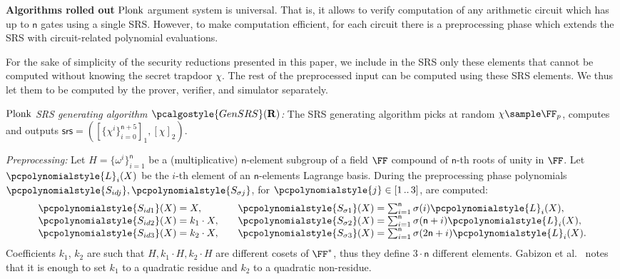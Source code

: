\documentclass[10pt]{llncs}
\renewcommand{\kgen}{\pcalgostyle{GenSRS}}
\newcommand{\pcvarstyle}[1]{\mathsf{#1}}
\newcommand{\myskip}{-0.16\baselineskip}
\newcommand{\range}[2] {[#1 \, .. \, #2]}
\newcommand{\smallset}[1] {\{#1\}}
\newcommand{\p}[1]{\pcpolynomialstyle{#1}}
\newcommand{\numberofconstrains}{\pcvarstyle{n}}
\newcommand{\noofc}{\numberofconstrains}
\newcommand{\bmap}[2] {\left[#1\right]_{#2}}
\newcommand{\gone}[1] {\bmap{#1}{1}}
\newcommand{\gtwo}[1] {\bmap{#1}{2}}
\newcommand{\srs}{\pcvarstyle{srs}}
\newcommand{\lag}{\p{L}}
\newcommand{\REL}{\mathbf{R}}
\newcommand{\plonk}{\ensuremath{\textnormal{{Plonk}}}}
\newcommand{\oursubsub}[1] {\smallskip\noindent\textbf{#1}}
\newcommand{\ourpar}[1] {\smallskip\noindent\emph{#1}}
\begin{document}
\oursubsub{Algorithms rolled out}
\label{sec:plonk_explained}
\plonk{} argument system is universal. That is, it allows to verify computation
of any arithmetic circuit which has up to $\numberofconstrains$
gates using a single SRS. However, to make computation efficient, for each
circuit there is a preprocessing phase which extends the SRS with
circuit-related polynomial evaluations.

For the sake of simplicity of the security reductions presented in this paper, we
include in the SRS only these elements that cannot be computed without knowing
the secret trapdoor $\chi$. The rest of the preprocessed input can
be computed using these SRS elements. We thus let them to be computed by the
prover, verifier, and simulator separately.

\ourpar{$\plonk$ SRS generating algorithm $\kgen(\REL)$:}
The SRS generating algorithm picks at random $\chi \sample \FF_p$, computes
and outputs
\(
\srs = \left(\gone{\smallset{\chi^i}_{i = 0}^{\numberofconstrains + 5}},
\gtwo{\chi} \right).
\)

\ourpar{Preprocessing:}
Let $H = \smallset{\omega^i}_{i = 1}^{\numberofconstrains }$ be a
(multiplicative) $\numberofconstrains$-element subgroup of a field $\FF$
compound of $\numberofconstrains$-th roots of unity in $\FF$. Let $\lag_i(X)$ be
the $i$-th element of an $\numberofconstrains$-elements Lagrange basis. During
the preprocessing phase polynomials $\p{S_{id j}}, \p{S_{\sigma j}}$, for
$\p{j} \in \range{1}{3}$, are computed:
\begin{equation*}
\begin{aligned}
\p{S_{id 1}}(X) & = X,\\[\myskip]
\p{S_{id 2}}(X) & = k_1 \cdot X,\\[\myskip]
\p{S_{id 3}}(X) & = k_2 \cdot X,
\end{aligned}
\qquad
\begin{aligned}
\p{S_{\sigma 1}}(X) & = {\textstyle{\sum_{i = 1}^{\noofc} \sigma(i) \lag_i(X)}},\\[\myskip]
\p{S_{\sigma 2}}(X) & = {\textstyle \sum_{i = 1}^{\noofc}
	\sigma(\noofc + i) \lag_i(X)},\\[\myskip]
\p{S_{\sigma 3}}(X) & ={\textstyle\sum_{i = 1}^{\noofc} \sigma(2 \noofc + i) \lag_i(X)}.
\end{aligned}
\end{equation*}
Coefficients $k_1$, $k_2$ are such that $H, k_1 \cdot H, k_2 \cdot H$ are
different cosets of $\FF^*$, thus they define $3 \cdot \noofc$
different elements. Gabizon et al.~\cite{EPRINT:GabWilCio19} notes that it is enough to set
$k_1$ to a quadratic residue and $k_2$ to a quadratic non-residue.
\end{document}
